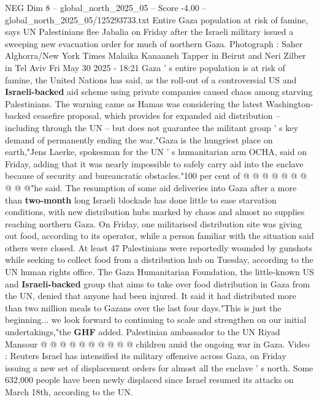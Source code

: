 \begin{textsample}{NEG Dim 8 – global\_north\_2025\_05 – Score -4.00 – global\_north\_2025\_05/125293733.txt}  \label{ex:f8_neg_051}
Entire Gaza population at risk of famine, says UN Palestinians flee Jabalia on Friday after the Israeli military issued a sweeping new evacuation order for much of northern Gaza.
Photograph : Saher Alghorra/New York Times Malaika Kanaaneh Tapper in Beirut and Neri Zilber in Tel Aviv Fri May 30 2025 - 18:21 Gaza ' s entire population is at risk of famine, the United Nations has said, as the roll-out of a controversial US and \textbf{Israeli-backed} aid scheme using private companies caused chaos among starving Palestinians.
The warning came as Hamas was considering the latest Washington-backed ceasefire proposal, which provides for expanded aid distribution -- including through the UN -- but does not guarantee the militant group ' s key demand of permanently ending the war."Gaza is the hungriest place on earth,"Jens Laerke, spokesman for the UN ' s humanitarian arm OCHA, said on Friday, adding that it was nearly impossible to safely carry aid into the enclave because of security and bureaucratic obstacles."100 per cent of @ @ @ @ @ @ @ @ @ @"he said.
The resumption of some aid deliveries into Gaza after a more than \textbf{two-month} long Israeli blockade has done little to ease starvation conditions, with new distribution hubs marked by chaos and almost no supplies reaching northern Gaza.
On Friday, one militarised distribution site was giving out food, according to its operator, while a person familiar with the situation said others were closed.
At least 47 Palestinians were reportedly wounded by gunshots while seeking to collect food from a distribution hub on Tuesday, according to the UN human rights office.
The Gaza Humanitarian Foundation, the little-known US and \textbf{Israeli-backed} group that aims to take over food distribution in Gaza from the UN, denied that anyone had been injured.
It said it had distributed more than two million meals to Gazans over the last four days."This is just the beginning... we look forward to continuing to scale and strengthen on our initial undertakings,"the \textbf{GHF} added.
Palestinian ambassador to the UN Riyad Mansour @ @ @ @ @ @ @ @ @ @ children amid the ongoing war in Gaza.
Video : Reuters Israel has intensified its military offensive across Gaza, on Friday issuing a new set of displacement orders for almost all the enclave ' s north.
Some 632,000 people have been newly displaced since Israel resumed its attacks on March 18th, according to the UN.

\end{textsample}
